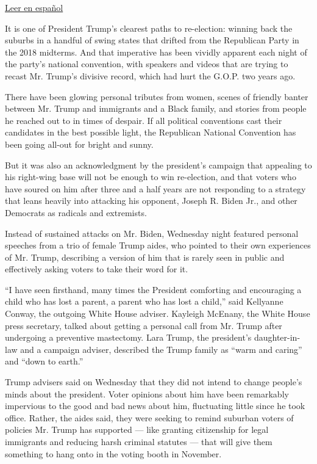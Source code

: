 \href{https://www.nytimes3xbfgragh.onion/es/2020/08/27/espanol/estados-unidos/trump-convencion-republicana.html}{Leer
en español}

It is one of President Trump's clearest paths to re-election: winning
back the suburbs in a handful of swing states that drifted from the
Republican Party in the 2018 midterms. And that imperative has been
vividly apparent each night of the party's national convention, with
speakers and videos that are trying to recast Mr. Trump's divisive
record, which had hurt the G.O.P. two years ago.

There have been glowing personal tributes from women, scenes of friendly
banter between Mr. Trump and immigrants and a Black family, and stories
from people he reached out to in times of despair. If all political
conventions cast their candidates in the best possible light, the
Republican National Convention has been going all-out for bright and
sunny.

But it was also an acknowledgment by the president's campaign that
appealing to his right-wing base will not be enough to win re-election,
and that voters who have soured on him after three and a half years are
not responding to a strategy that leans heavily into attacking his
opponent, Joseph R. Biden Jr., and other Democrats as radicals and
extremists.

Instead of sustained attacks on Mr. Biden, Wednesday night featured
personal speeches from a trio of female Trump aides, who pointed to
their own experiences of Mr. Trump, describing a version of him that is
rarely seen in public and effectively asking voters to take their word
for it.

``I have seen firsthand, many times the President comforting and
encouraging a child who has lost a parent, a parent who has lost a
child,'' said Kellyanne Conway, the outgoing White House adviser.
Kayleigh McEnany, the White House press secretary, talked about getting
a personal call from Mr. Trump after undergoing a preventive mastectomy.
Lara Trump, the president's daughter-in-law and a campaign adviser,
described the Trump family as ``warm and caring'' and ``down to earth.''

Trump advisers said on Wednesday that they did not intend to change
people's minds about the president. Voter opinions about him have been
remarkably impervious to the good and bad news about him, fluctuating
little since he took office. Rather, the aides said, they were seeking
to remind suburban voters of policies Mr. Trump has supported --- like
granting citizenship for legal immigrants and reducing harsh criminal
statutes --- that will give them something to hang onto in the voting
booth in November.

